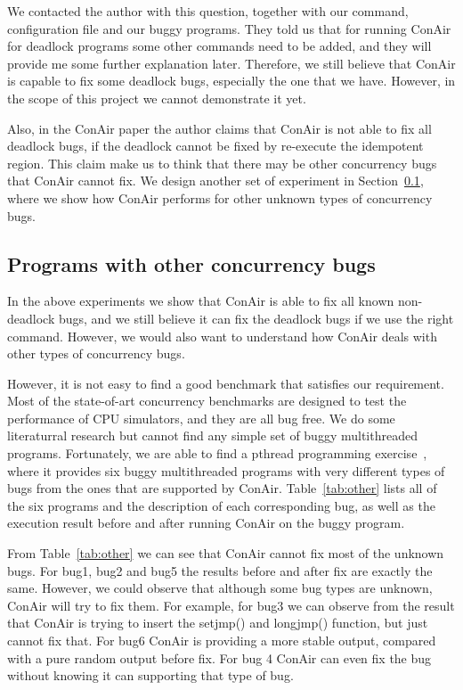 We contacted the author with this question, together with our command,
configuration file and our buggy programs. They told us that for running ConAir
for deadlock programs some other commands need to be added, and they will
  provide me some further explanation later. Therefore, we still believe that
  ConAir is capable to fix some deadlock bugs, especially the one that we have. However, in the scope of this project we cannot demonstrate it yet.

Also, in the ConAir paper the author claims that ConAir is not able to fix all
deadlock bugs, if the deadlock cannot be fixed by re-execute the idempotent
region. This claim make us to think that there may be other concurrency bugs
that ConAir cannot fix. We design another set of experiment in
Section~\ref{sec:ex-other}, where we show how ConAir performs for other unknown
types of concurrency bugs.

\subsection{Programs with other concurrency bugs}
\label{sec:ex-other}

In the above experiments we show that ConAir is able to fix all known
non-deadlock bugs, and we still believe it can fix the deadlock bugs if we use
the right command. However, we would also want to understand how ConAir deals
with other types of concurrency bugs.

However, it is not easy to find a good benchmark that satisfies our requirement.
Most of the state-of-art concurrency benchmarks are designed to test the
performance of CPU simulators, and they are all bug free. We do some literaturral
research but cannot find any simple set of buggy multithreaded programs.
Fortunately, we are able to find a pthread programming
exercise~\cite{pthread-web}, where it provides six buggy multithreaded programs
with very different types of bugs from the ones that are supported by ConAir.
Table~\ref{tab:other} lists all of the six programs and the description of each
corresponding bug, as well as the execution result before and after running
ConAir on the buggy program.

From Table~\ref{tab:other} we can see that ConAir cannot fix most of the
unknown bugs. For bug1, bug2 and bug5 the results before and after fix are
exactly the same. However, we could observe that although some bug types are
unknown, ConAir will try to fix them. For example, for bug3 we can observe from
the result that ConAir is trying to insert the setjmp() and longjmp() function,
but just cannot fix that. For bug6 ConAir is providing a more stable output,
compared with a pure random output before fix. For bug 4 ConAir can even fix the
bug without knowing it can supporting that type of bug.
